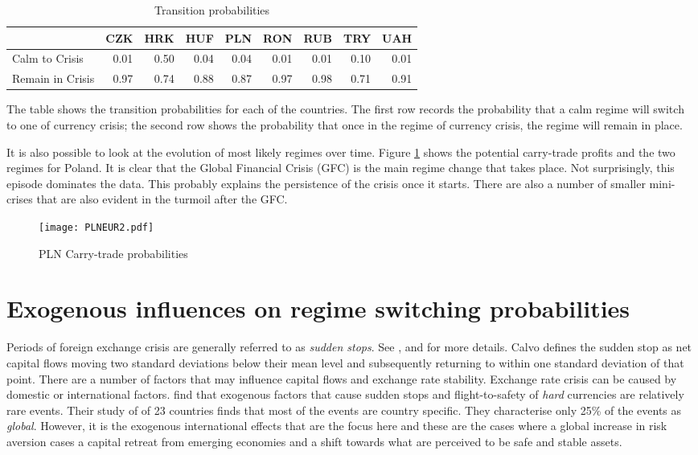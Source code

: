 \documentclass[12pt, a4paper, oneside]{article}\usepackage[]{graphicx}\usepackage[]{color}
\begin{document}
\begin{table}[t]
\begin{threeparttable}
\centering
\begin{tabular}{p{3cm}rrrrrrrr}
  \hline
& CZK & HRK & HUF & PLN & RON & RUB & TRY & UAH\\ 
  \hline
Calm to Crisis & 0.01 & 0.50 & 0.04 & 0.04 & 0.01 & 0.01 & 0.10 & 0.01\\
Remain in Crisis & 0.97 & 0.74 & 0.88 & 0.87 & 0.97 & 0.98 & 0.71 & 0.91 \\
  \hline
\end{tabular}
\begin{tablenotes}
\small
\item  The table shows the transition probabilities for each of the countries.  The first row records the probability that a calm regime will switch to one of currency crisis; the second row shows the probability that once in the regime of currency crisis, the regime will remain in place. 
\end{tablenotes}
\caption{Transition probabilities}
\label{tabref:transprob}
\end{threeparttable}
\end{table}

It is also possible to look at the evolution of most likely regimes over time.  Figure \ref{figref:pln} shows the potential carry-trade profits and the two regimes for Poland.  It is clear that the Global Financial Crisis (GFC) is the main regime change that takes place.  Not surprisingly, this episode dominates the data.  This probably explains the persistence of the crisis once it starts. There are also a number of smaller mini-crises that are also evident in the turmoil after the GFC. 

\begin{figure}[ht]
\centering
\texttt{[image: PLNEUR2.pdf]}
\caption{PLN Carry-trade probabilities}
\label{figref:pln}
\end{figure}

\section{Exogenous influences on regime switching probabilities}
Periods of foreign exchange crisis are generally referred to as \emph{sudden stops}.  See \citet{DornbuschSS}, \citet{CalvoSS} and \citet{KrugmanSS} for more details. Calvo  defines the sudden stop as net capital flows moving two standard deviations below their mean level and subsequently returning to within one standard deviation of that point. There are a number of factors that may influence capital flows and exchange rate stability. Exchange rate crisis can be caused by domestic or international factors.  \citet{FTS} find  that exogenous factors that cause sudden stops and flight-to-safety of \emph{hard} currencies  are relatively rare events. Their study of of 23 countries finds that most of the events are country specific. They characterise only 25\% of the events as \emph{global}. However, it is the exogenous international effects that are the focus here and these are the cases where a global increase in risk aversion cases a capital retreat from emerging economies and a shift towards what are perceived to be safe and stable assets. 
\end{document}
